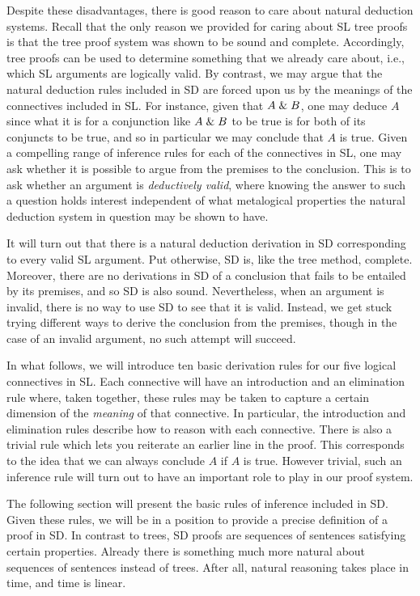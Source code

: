 Despite these disadvantages, there is good reason to care about natural deduction systems. %
Recall that the only reason we provided for caring about SL tree proofs is that the tree proof system was shown to be sound and complete.
Accordingly, tree proofs can be used to determine something that we already care about, i.e., which SL arguments are logically valid.
By contrast, we may argue that the natural deduction rules included in SD are forced upon us by the meanings of the connectives included in SL.
For instance, given that $A\mathrel\& B$, one may deduce $A$ since what it is for a conjunction like $A\mathrel\& B$ to be true is for both of its conjuncts to be true, and so in particular we may conclude that $A$ is true. 
Given a compelling range of inference rules for each of the connectives in SL, one may ask whether it is possible to argue from the premises to the conclusion.
This is to ask whether an argument is \textit{deductively valid}, where knowing the answer to such a question holds interest independent of what metalogical properties the natural deduction system in question may be shown to have.

It will turn out that there is a natural deduction derivation in SD corresponding to every valid SL argument.
Put otherwise, SD is, like the tree method, complete.
Moreover, there are no derivations in SD of a conclusion that fails to be entailed by its premises, and so SD is also sound.
Nevertheless, when an argument is invalid, there is no way to use SD to see that it is valid.
Instead, we get stuck trying different ways to derive the conclusion from the premises, though in the case of an invalid argument, no such attempt will succeed.

In what follows, we will introduce ten basic derivation rules for our five logical connectives in SL.
Each connective will have an introduction and an elimination rule where, taken together, these rules may be taken to capture a certain dimension of the \textit{meaning} of that connective.
In particular, the introduction and elimination rules describe how to reason with each connective.
There is also a trivial rule which lets you reiterate an earlier line in the proof.
This corresponds to the idea that we can always conclude $A$ if $A$ is true.
However trivial, such an inference rule will turn out to have an important role to play in our proof system.

The following section will present the basic rules of inference included in SD.
Given these rules, we will be in a position to provide a precise definition of a proof in SD.
In contrast to trees, SD proofs are sequences of sentences satisfying certain properties.
Already there is something much more natural about sequences of sentences instead of trees.
After all, natural reasoning takes place in time, and time is linear.



